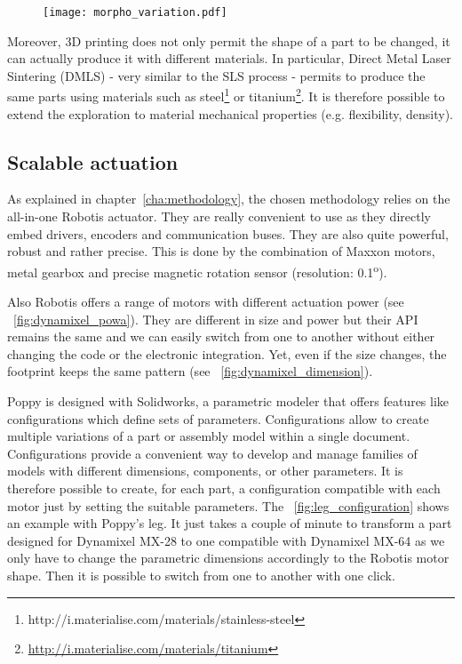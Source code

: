 \begin{figure}[ht]
    \begin{center}
        \texttt{[image: morpho\_variation.pdf]}
    \end{center}
    \caption{}
    \label{fig:exploring-morpho-poppy}
\end{figure}


Moreover, 3D printing does not only permit the shape of a part to be changed, it can actually produce it with different materials. In particular, Direct Metal Laser Sintering (DMLS) - very similar to the SLS process - permits to produce the same parts using materials such as steel\footnote{http://i.materialise.com/materials/stainless-steel} or titanium\footnote{\url{http://i.materialise.com/materials/titanium}}. It is therefore possible to extend the exploration to material mechanical properties (e.g. flexibility, density).


\subsection{Scalable actuation} %

As explained in chapter~\ref{cha:methodology}, the chosen methodology relies on the all-in-one Robotis actuator. They are really convenient to use as they directly embed drivers, encoders and communication buses. They are also quite powerful, robust and rather precise. This is done by the combination of Maxxon motors, metal gearbox and precise magnetic rotation sensor (resolution: 0.1\textsuperscript{o}).

Also Robotis offers a range of motors with different actuation power (see \figurename~\ref{fig:dynamixel_powa}). They are different in size and power but their API remains the same and we can easily switch from one to another without either changing the code or the electronic integration. Yet, even if the size changes, the footprint keeps the same pattern (see \figurename~\ref{fig:dynamixel_dimension}).

Poppy is designed with Solidworks, a parametric modeler that offers features like configurations which define sets of parameters. Configurations allow to create multiple variations of a part or assembly model within a single document. Configurations provide a convenient way to develop and manage families of models with different dimensions, components, or other parameters. It is therefore possible to create, for each part, a configuration compatible with each motor just by setting the suitable parameters. The \figurename~\ref{fig:leg_configuration} shows an example with Poppy's leg. It just takes a couple of minute to transform a part designed for Dynamixel MX-28 to one compatible with Dynamixel MX-64 as we only have to change the parametric dimensions accordingly to the Robotis motor shape. Then it is possible to switch from one to another with one click.


